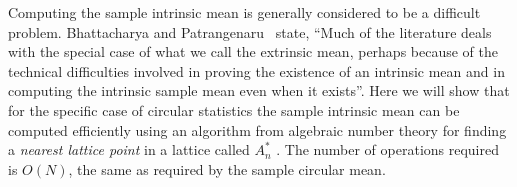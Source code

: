 \documentclass[journal]{IEEEtran}
\begin{document}

Computing the sample intrinsic mean is generally considered to be a difficult problem. Bhattacharya and Patrangenaru~\cite{Bhattacharya_int_ext_means_2005} state, ``Much of the literature deals with the special case of what we call the extrinsic mean, perhaps because of the technical difficulties involved in proving the existence of an intrinsic mean and in computing the intrinsic sample mean even when it exists''.  Here we will show that for the specific case of circular statistics the sample intrinsic mean can be computed efficiently using an algorithm from algebraic number theory for finding a \emph{nearest lattice point} in a lattice called $A_n^*$ \cite{McKilliam2009CoxeterLattices,McKilliam2008b,McKilliam2008,SPLAG,Conway1982FastQuantDec,Martinet2003}. The number of operations required is $O(N)$, the same as required by the sample circular mean.

\end{document}

